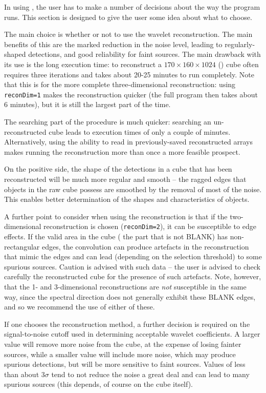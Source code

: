 \label{sec-notes}

In using \duchamp, the user has to make a number of decisions about
the way the program runs. This section is designed to give the user
some idea about what to choose.

The main choice is whether or not to use the wavelet
reconstruction. The main benefits of this are the marked reduction in
the noise level, leading to regularly-shaped detections, and good
reliability for faint sources. The main drawback with its use is the
long execution time: to reconstruct a $170\times160\times1024$
(\hipass) cube often requires three iterations and takes about 20-25
minutes to run completely. Note that this is for the more complete
three-dimensional reconstruction: using \texttt{reconDim=1} makes the
reconstruction quicker (the full program then takes about 6 minutes),
but it is still the largest part of the time.

The searching part of the procedure is much quicker: searching an
un-reconstructed cube leads to execution times of only a couple of
minutes. Alternatively, using the ability to read in previously-saved
reconstructed arrays makes running the reconstruction more than once a
more feasible prospect.

On the positive side, the shape of the detections in a cube that has
been reconstructed will be much more regular and smooth -- the ragged
edges that objects in the raw cube possess are smoothed by the removal
of most of the noise. This enables better determination of the shapes
and characteristics of objects.

A further point to consider when using the reconstruction is that if
the two-dimensional reconstruction is chosen (\texttt{reconDim=2}), it
can be susceptible to edge effects. If the valid area in the cube (\ie
the part that is not BLANK) has non-rectangular edges, the convolution
can produce artefacts in the reconstruction that mimic the edges and
can lead (depending on the selection threshold) to some spurious
sources. Caution is advised with such data -- the user is advised to
check carefully the reconstructed cube for the presence of such
artefacts. Note, however, that the 1- and 3-dimensional
reconstructions are \emph{not} susceptible in the same way, since the
spectral direction does not generally exhibit these BLANK edges, and
so we recommend the use of either of these.

If one chooses the reconstruction method, a further decision is
required on the signal-to-noise cutoff used in determining acceptable
wavelet coefficients. A larger value will remove more noise from the
cube, at the expense of losing fainter sources, while a smaller value
will include more noise, which may produce spurious detections, but
will be more sensitive to faint sources. Values of less than about
$3\sigma$ tend to not reduce the noise a great deal and can lead to
many spurious sources (this depends, of course on the cube itself).

